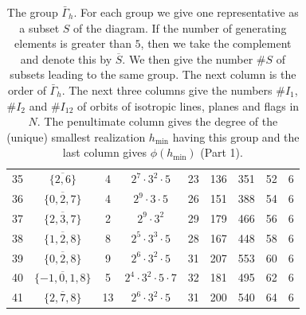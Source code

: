 \documentclass[a4paper,11pt]{article}
\begin{document}
\begin{table}
\begin{center}
{\begin{tabular}{|c|c|c|c|c|c|c|c|c|}
35 & $\overline{\{2,6\}}$ & 4 & $2^{7} \cdot 3^{2} \cdot 5$ & 23 & 136 & 351 & 52 & 6\\
36 & $\overline{\{0,2,7\}}$ & 4 & $2^{9} \cdot 3 \cdot 5$ & 26 & 151 & 388 & 54 & 6\\
37 & $\overline{\{2,3,7\}}$ & 2 & $2^{9} \cdot 3^{2}$ & 29 & 179 & 466 & 56 & 6\\
38 & $\overline{\{1,2,8\}}$ & 8 & $2^{5} \cdot 3^{3} \cdot 5$ & 28 & 167 & 448 & 58 & 6\\
39 & $\overline{\{0,2,8\}}$ & 9 & $2^{6} \cdot 3^{2} \cdot 5$ & 31 & 207 & 553 & 60 & 6\\
40 & $\overline{\{-1,0,1,8\}}$ & 5 & $2^{4} \cdot 3^{2} \cdot 5 \cdot 7$ & 32 & 181 & 495 & 62 & 6\\
41 & $\overline{\{2,7,8\}}$ & 13 & $2^{6} \cdot 3^{2} \cdot 5$ & 31 & 200 & 540 & 64 & 6\\
\hline
\end{tabular}
}
\caption{The group $\bar \Gamma_h$. For each group we give one representative as a subset $S$ of the diagram. If the number of generating elements is greater than $5$, then we take the complement
and denote this by $\overline S$.
  We then give the number $\# S$ of subsets leading to the same group. 
  The next column is  the order of $\bar \Gamma_h$.
  The next three columns give the numbers $\#  I_1$, $\#  I_2$ and $\# I_{12}$ of orbits of isotropic lines, planes and flags in $N$.
  The penultimate column gives the degree of the (unique) smallest realization $h_{\min}$ having this group and the last column gives $\phi(h_{\min})$ (Part 1).}\label{table_subgroups1}
\end{center}
\end{table}
\end{document}
